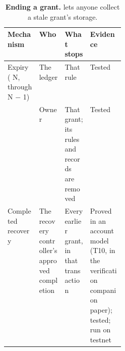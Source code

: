 \begin{table}[tbp]
\centering
\caption{\textbf{Ending a grant.}  lets anyone collect a stale grant's storage.}\label{tab:tab-revoke}
\scriptsize\begin{tabularx}{\linewidth}{@{}p{0.27\linewidth}LLL@{}}
\toprule
\textbf{Mechanism} & \textbf{Who} & \textbf{What stops} & \textbf{Evidence} \\
\midrule
Expiry ( N, through N \ensuremath{-} 1) & The ledger & That rule & Tested \\
 & Owner & That grant; its rules and records are removed & Tested \\
Completed recovery & The recovery controller's approved completion & Every earlier grant, in that transaction & Proved in an account model (T10, in the verification companion paper); tested; run on testnet \\
\bottomrule
\end{tabularx}
\end{table}

